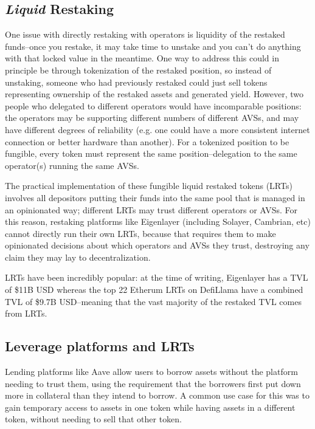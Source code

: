 \documentclass{article}
\begin{document}
\subsection{\textit{Liquid} Restaking}
One issue with directly restaking with operators is liquidity of the restaked funds--once you restake, it may take time to unstake and you can't do anything with that locked value in the meantime\cite{kelp_dao}. One way to address this could in principle be through tokenization of the restaked position, so instead of unstaking, someone who had previously restaked could just sell tokens representing ownership of the restaked assets and generated yield. However, two people who delegated to different operators would have incomparable positions: the operators may be supporting different numbers of different AVSs, and may have different degrees of reliability (e.g. one could have a more consistent internet connection or better hardware than another). For a tokenized position to be fungible, every token must represent the same position--delegation to the same operator(s) running the same AVSs.

The practical implementation of these fungible liquid restaked tokens (LRTs) involves all depositors putting their funds into the same pool that is managed in an opinionated way; different LRTs may trust different operators or AVSs. For this reason, restaking platforms like Eigenlayer (including Solayer, Cambrian, etc) cannot directly run their own LRTs, because that requires them to make opinionated decisions about which operators and AVSs they trust, destroying any claim they may lay to decentralization.

LRTs have been incredibly popular: at the time of writing, Eigenlayer has a TVL of \$11B USD\cite{eigenlayer_tvl} whereas the top 22 Etherum LRTs on DefiLlama have a combined TVL of \$9.7B USD\cite{lrts_tvl}--meaning that the vast majority of the restaked TVL comes from LRTs.

\subsection{Leverage platforms and LRTs}
Lending platforms like Aave allow users to borrow assets without the platform needing to trust them, using the requirement that the borrowers first put down more in collateral than they intend to borrow\cite{aave}. A common use case for this was to gain temporary access to assets in one token while having assets in a different token, without needing to sell that other token.
\end{document}
